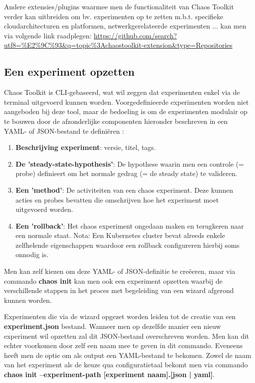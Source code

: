 Andere extensies/plugins waarmee men de functionaliteit van Chaos Toolkit verder kan uitbreiden om bv. experimenten op te zetten m.b.t. specifieke cloudarchitecturen en platformen, netwerkgerelateerde experimenten ... kan men via volgende link raadplegen: \url{https://github.com/search?utf8=%E2%9C%93&q=topic%3Achaostoolkit-extension&type=Repositories} 

\subsection{Een experiment opzetten}

Chaos Toolkit is CLI-gebaseerd, wat wil zeggen dat experimenten enkel via de terminal uitgevoerd kunnen worden. Voorgedefinieerde experimenten worden niet aangeboden bij deze tool, maar de bedoeling is om de experimenten modulair op te bouwen door de afzonderlijke componenten hieronder beschreven in een YAML- of JSON-bestand te definiëren \autocite{ChaosToolkit2022a}:
\begin{enumerate}
    \item {\bf Beschrijving experiment}: versie, titel, tags.
    \item {\bf De 'steady-state-hypothesis'}: De hypothese waarin men een controle (= probe) definieert om het normale gedrag (= de steady state) te valideren.
    \item {\bf Een 'method'}: De activiteiten van een chaos experiment. Deze kunnen acties en probes bevatten die omschrijven hoe het experiment moet uitgevoerd worden.  
    \item {\bf Een 'rollback'}: Het chaos experiment ongedaan maken en terugkeren naar een normale staat. Nota: Een Kubernetes cluster bevat alreeds enkele zelfhelende eigenschappen waardoor een rollback configureren hierbij soms onnodig is.
\end{enumerate}
    
Men kan zelf kiezen om deze YAML- of JSON-definitie te creëeren, maar via commando {\bf chaos init} kan men ook een experiment opzetten waarbij de verschillende stappen in het proces met begeleiding van een wizard afgerond kunnen worden. 

Experimenten die via de wizard opgezet worden leiden tot de creatie van een {\bf experiment.json} bestand. Wanneer men op dezelfde manier een nieuw experiment wil opzetten zal dit JSON-bestand overschreven worden. Men kan dit echter voorkomen door zelf een naam mee te geven in dit commando. Eveneens heeft men de optie om als output een YAML-bestand te bekomen. Zowel de naam van het experiment als de keuze qua configuratietaal bekomt men via commando {\bf chaos init --experiment-path [experiment naam].[json | yaml]}.

